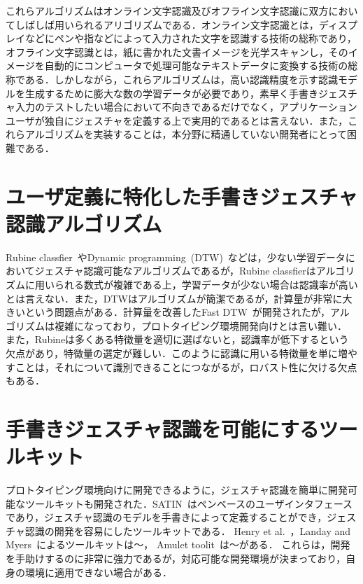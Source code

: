 これらアルゴリズムはオンライン文字認識及びオフライン文字認識に双方においてしばしば用いられるアリゴリズムである．オンライン文字認識とは，ディスプレイなどにペンや指などによって入力された文字を認識する技術の総称であり，オフライン文字認識とは，紙に書かれた文書イメージを光学スキャンし，そのイメージを自動的にコンピュータで処理可能なテキストデータに変換する技術の総称である．しかしながら，これらアルゴリズムは，高い認識精度を示す認識モデルを生成するために膨大な数の学習データが必要であり，素早く手書きジェスチャ入力のテストしたい場合において不向きであるだけでなく，アプリケーションユーザが独自にジェスチャを定義する上で実用的であるとは言えない．また，これらアルゴリズムを実装することは，本分野に精通していない開発者にとって困難である．

\section{ユーザ定義に特化した手書きジェスチャ認識アルゴリズム}
Rubine classfier~\cite{Rubine:1991:SGE:122718.122753}やDynamic programming~(DTW)~\cite{Tappert:1982:CSR:1664966.1664979}などは，少ない学習データにおいてジェスチャ認識可能なアルゴリズムであるが，Rubine classfierはアルゴリズムに用いられる数式が複雑である上，学習データが少ない場合は認識率が高いとは言えない．また，DTWはアルゴリズムが簡潔であるが，計算量が非常に大きいという問題点がある．計算量を改善したFast DTW~\cite{Salvador:2007:TAD:1367985.1367993}が開発されたが，アルゴリズムは複雑になっており，プロトタイピング環境開発向けとは言い難い．
また，Rubineは多くある特徴量を適切に選ばないと，認識率が低下するという欠点があり，特徴量の選定が難しい．このように認識に用いる特徴量を単に増やすことは，それについて識別できることにつながるが，ロバスト性に欠ける欠点もある．

\section{手書きジェスチャ認識を可能にするツールキット}
プロトタイピング環境向けに開発できるように，ジェスチャ認識を簡単に開発可能なツールキットも開発された．SATIN~\cite{Hong:2000:STI:354401.354412}はペンベースのユーザインタフェースであり，ジェスチャ認識のモデルを手書きによって定義することができ，ジェスチャ認識の開発を容易にしたツールキットである．
Henry et al.~\cite{Henry:1990:IGS:97924.97938}，Landay and Myers~\cite{Landay:1993:EEU:259964.260123}によるツールキットは〜，
Amulet toolit~\cite{Myers:1997:AEN:262050.260628}は〜がある．
これらは，開発を手助けするのに非常に強力であるが，対応可能な開発環境が決まっており，自身の環境に適用できない場合がある．

